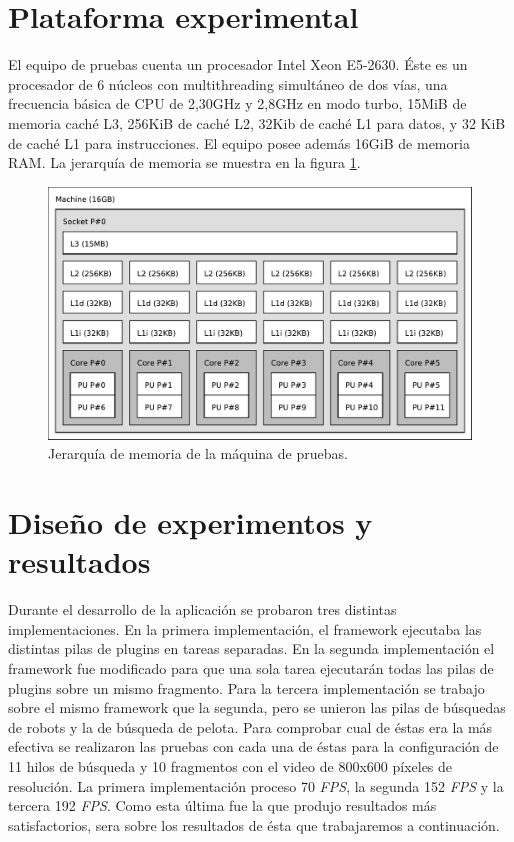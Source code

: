 \section{Plataforma experimental}

\label{plataformaExperimental}

El equipo de pruebas cuenta un procesador Intel Xeon E5-2630. Éste es un
procesador de 6 núcleos con multithreading simultáneo de dos vías, una
frecuencia básica de CPU de 2,30GHz y 2,8GHz en modo turbo, 15MiB de memoria
caché L3, 256KiB de caché L2, 32Kib de caché L1 para datos, y 32 KiB de caché L1
para instrucciones. El equipo posee además 16GiB de memoria RAM. La jerarquía de
memoria se muestra en la figura \ref{topoMemoria}.

\begin{figure}[h]

	\includegraphics[width=\textwidth]{img/topo.pdf}
	\caption{Jerarquía de memoria de la máquina de pruebas.}

	\label{topoMemoria}

\end{figure}

\section{Diseño de experimentos y resultados}

\label{resultados}

Durante el desarrollo de la aplicación se probaron tres distintas
implementaciones. En la primera implementación, el framework ejecutaba las
distintas pilas de plugins en tareas separadas. En la segunda implementación el
framework fue modificado para que una sola tarea ejecutarán todas las pilas de
plugins sobre un mismo fragmento. Para la tercera implementación se trabajo
sobre el mismo framework que la segunda, pero se unieron las pilas de búsquedas
de robots y la de búsqueda de pelota. Para comprobar cual de éstas era la más
efectiva se realizaron las pruebas con cada una de éstas para la configuración
de 11 hilos de búsqueda y 10 fragmentos con el video de 800x600 píxeles de
resolución. La primera implementación proceso 70 \emph{FPS}, la segunda 152
\emph{FPS} y la tercera 192 \emph{FPS}. Como esta última fue la que produjo
resultados más satisfactorios, sera sobre los resultados de ésta que
trabajaremos a continuación.

